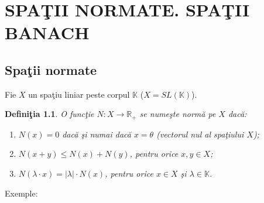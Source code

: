 \documentclass[ a4paper, 12pt]{report}
\newtheorem{definition}{\bf Defini\c tia}[section]
\theoremstyle{remark}
\numberwithin{equation}{section}
\begin{document}
\chapter{SPA\c TII NORMATE. SPA\c TII BANACH}
\section{Spa\c tii normate}
Fie $X$ un spa\c tiu liniar peste corpul $\mathbb{K}$ ($X= SL(\mathbb{K})$).
\begin{definition}
O func\c tie $N : X \rightarrow \mathbb{R}_{+}$ se nume\c ste norm\u a pe $X$ dac\u a:
\begin{enumerate}[($n_1$)]
\item $N(x) = 0$ dac\u a \c si numai dac\u a $x = \theta$ (vectorul nul al spa\c tiului $X$);
\item $N(x + y) \leq N(x) + N(y)$, pentru orice $x,y \in X$;
\item $N(\lambda \cdot x) = \lvert \lambda\rvert \cdot N(x)$, pentru orice $x \in X$ \c si $\lambda \in \mathbb{K}$.
\end{enumerate}
\end{definition}
Exemple:
\end{document}

